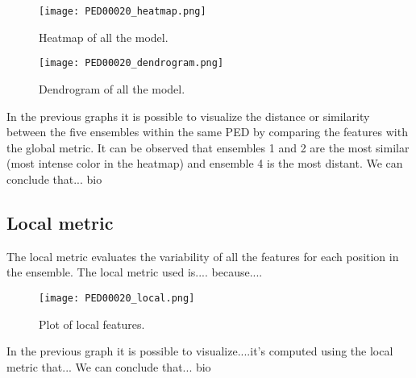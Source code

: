 \begin{figure}[H]
	\begin{minipage}[b]{0.9\textwidth}
		\centering
		\texttt{[image: PED00020\_heatmap.png]}
		\caption{Heatmap of all the model.}
		\label{heatmap}
	\end{minipage}
	\hfill
	\begin{minipage}[b]{0.9\textwidth}
		\centering
		\texttt{[image: PED00020\_dendrogram.png]}
		\caption{Dendrogram of all the model.}
		\label{dendrogram}
	\end{minipage}
\end{figure}

In the previous graphs it is possible to visualize the distance or similarity between the five ensembles within the same PED by comparing the features with the global metric. It can be observed that ensembles 1 and 2 are the most similar (most intense color in the heatmap) and ensemble 4 is the most distant.
We can conclude that... bio


\subsection{Local metric}
The local metric evaluates the variability of all the features for each position in the ensemble.
The local metric used is.... because....

\begin{figure}[H]
	\begin{minipage}[b]{0.9\textwidth}
		\centering
		\texttt{[image: PED00020\_local.png]}
		\caption{Plot of local features.}
		\label{plot}
	\end{minipage}	
\end{figure}
In the previous graph it is possible to visualize....it's computed using the local metric that...
We can conclude that... bio